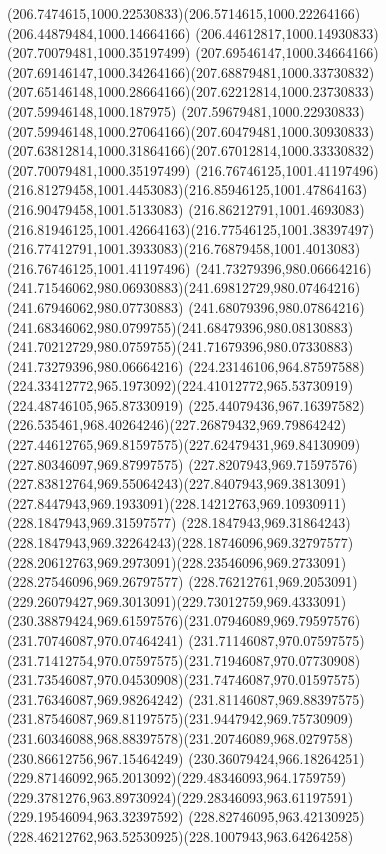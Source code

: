 {{  \curveto(206.7474615,1000.22530833)(206.5714615,1000.22264166)(206.44879484,1000.14664166)
  \lineto(206.44612817,1000.14930833)
  \moveto(207.70079481,1000.35197499)
  \curveto(207.69546147,1000.34664166)(207.69146147,1000.34264166)(207.68879481,1000.33730832)
  \curveto(207.65146148,1000.28664166)(207.62212814,1000.23730833)(207.59946148,1000.187975)
  \curveto(207.59679481,1000.22930833)(207.59946148,1000.27064166)(207.60479481,1000.30930833)
  \curveto(207.63812814,1000.31864166)(207.67012814,1000.33330832)(207.70079481,1000.35197499)
  \moveto(216.76746125,1001.41197496)
  \curveto(216.81279458,1001.4453083)(216.85946125,1001.47864163)(216.90479458,1001.5133083)
  \curveto(216.86212791,1001.4693083)(216.81946125,1001.42664163)(216.77546125,1001.38397497)
  \curveto(216.77412791,1001.3933083)(216.76879458,1001.4013083)(216.76746125,1001.41197496)
  \moveto(241.73279396,980.06664216)
  \curveto(241.71546062,980.06930883)(241.69812729,980.07464216)(241.67946062,980.07730883)
  \curveto(241.68079396,980.07864216)(241.68346062,980.0799755)(241.68479396,980.08130883)
  \curveto(241.70212729,980.0759755)(241.71679396,980.07330883)(241.73279396,980.06664216)
  \moveto(224.23146106,964.87597588)
  \curveto(224.33412772,965.1973092)(224.41012772,965.53730919)(224.48746105,965.87330919)
  \curveto(225.44079436,967.16397582)(226.535461,968.40264246)(227.26879432,969.79864242)
  \curveto(227.44612765,969.81597575)(227.62479431,969.84130909)(227.80346097,969.87997575)
  \curveto(227.8207943,969.71597576)(227.83812764,969.55064243)(227.8407943,969.3813091)
  \curveto(227.8447943,969.1933091)(228.14212763,969.10930911)(228.1847943,969.31597577)
  \curveto(228.1847943,969.31864243)(228.1847943,969.32264243)(228.18746096,969.32797577)
  \curveto(228.20612763,969.2973091)(228.23546096,969.2733091)(228.27546096,969.26797577)
  \curveto(228.76212761,969.2053091)(229.26079427,969.3013091)(229.73012759,969.4333091)
  \curveto(230.38879424,969.61597576)(231.07946089,969.79597576)(231.70746087,970.07464241)
  \curveto(231.71146087,970.07597575)(231.71412754,970.07597575)(231.71946087,970.07730908)
  \curveto(231.73546087,970.04530908)(231.74746087,970.01597575)(231.76346087,969.98264242)
  \curveto(231.81146087,969.88397575)(231.87546087,969.81197575)(231.9447942,969.75730909)
  \curveto(231.60346088,968.88397578)(231.20746089,968.0279758)(230.86612756,967.15464249)
  \curveto(230.36079424,966.18264251)(229.87146092,965.2013092)(229.48346093,964.1759759)
  \curveto(229.3781276,963.89730924)(229.28346093,963.61197591)(229.19546094,963.32397592)
  \curveto(228.82746095,963.42130925)(228.46212762,963.52530925)(228.1007943,963.64264258)
}}
